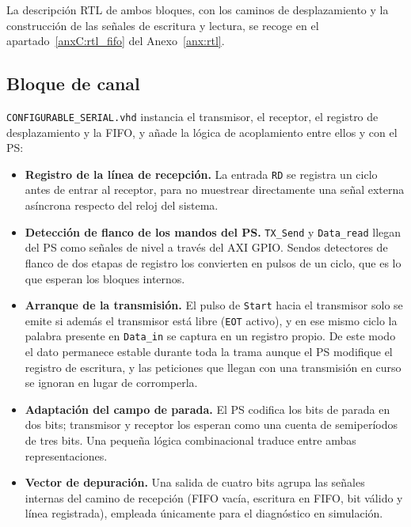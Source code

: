 La descripción RTL de ambos bloques, con los caminos de desplazamiento y la construcción de las
señales de escritura y lectura, se recoge en el apartado~\ref{anxC:rtl_fifo} del Anexo~\ref{anx:rtl}.

\subsection{Bloque de canal} \label{sec:bloque_canal}

\texttt{CONFIGURABLE\_SERIAL.vhd} instancia el transmisor, el receptor, el registro de
desplazamiento y la FIFO, y añade la lógica de acoplamiento entre ellos y con el PS:

\begin{itemize}
    \item \textbf{Registro de la línea de recepción.} La entrada \texttt{RD} se registra un ciclo
    antes de entrar al receptor, para no muestrear directamente una señal externa asíncrona
    respecto del reloj del sistema.

    \item \textbf{Detección de flanco de los mandos del PS.} \texttt{TX\_Send} y
    \texttt{Data\_read} llegan del PS como señales de nivel a través del AXI GPIO. Sendos
    detectores de flanco de dos etapas de registro los convierten en pulsos de un ciclo, que es lo
    que esperan los bloques internos.

    \item \textbf{Arranque de la transmisión.} El pulso de \texttt{Start} hacia el transmisor solo
    se emite si además el transmisor está libre (\texttt{EOT} activo), y en ese mismo ciclo la
    palabra presente en \texttt{Data\_in} se captura en un registro propio. De este modo el dato
    permanece estable durante toda la trama aunque el PS modifique el registro de escritura, y las
    peticiones que llegan con una transmisión en curso se ignoran en lugar de corromperla.

    \item \textbf{Adaptación del campo de parada.} El PS codifica los bits de parada en dos bits;
    transmisor y receptor los esperan como una cuenta de semiperíodos de tres bits. Una pequeña
    lógica combinacional traduce entre ambas representaciones.

    \item \textbf{Vector de depuración.} Una salida de cuatro bits agrupa las señales internas del
    camino de recepción (FIFO vacía, escritura en FIFO, bit válido y línea registrada), empleada
    únicamente para el diagnóstico en simulación.
\end{itemize}

